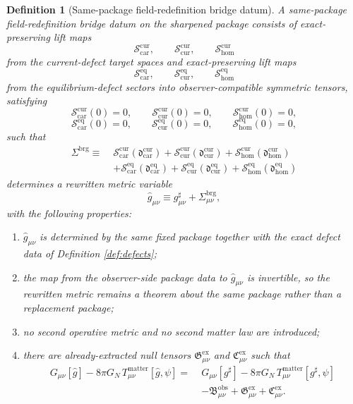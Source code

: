\documentclass[11pt]{article}
\newcommand{\CompletedMetric}{g^{\sharp}}
\newcommand{\RedefMetric}{\widehat g}
\newcommand{\BridgeShift}{\Sigma^{\mathrm{brg}}}
\newcommand{\ObsBurden}{\mathfrak B_{\mu\nu}^{\mathrm{obs}}}
\newcommand{\GaugeExact}{\mathfrak G_{\mu\nu}^{\mathrm{ex}}}
\newcommand{\ConstraintExact}{\mathfrak C_{\mu\nu}^{\mathrm{ex}}}
\newcommand{\TensorShiftLift}{\mathcal S_{\mathrm{car}}^{\mathrm{cur}}}
\newcommand{\CurShiftLift}{\mathcal S_{\mathrm{cur}}^{\mathrm{cur}}}
\newcommand{\HomShiftLift}{\mathcal S_{\mathrm{hom}}^{\mathrm{cur}}}
\newcommand{\TensorEqLift}{\mathcal S_{\mathrm{car}}^{\mathrm{eq}}}
\newcommand{\CurEqLift}{\mathcal S_{\mathrm{cur}}^{\mathrm{eq}}}
\newcommand{\HomEqLift}{\mathcal S_{\mathrm{hom}}^{\mathrm{eq}}}
\newtheorem{definition}{Definition}
\begin{document}
\begin{definition}[Same-package field-redefinition bridge datum]
\label{def:redef_bridge}
A \emph{same-package field-redefinition bridge datum} on the sharpened package consists of exact-preserving lift maps
\[
\TensorShiftLift,\qquad
\CurShiftLift,\qquad
\HomShiftLift
\]
from the current-defect target spaces and exact-preserving lift maps
\[
\TensorEqLift,\qquad
\CurEqLift,\qquad
\HomEqLift
\]
from the equilibrium-defect sectors into observer-compatible symmetric tensors, satisfying
\[
\TensorShiftLift(0)=0,\qquad
\CurShiftLift(0)=0,\qquad
\HomShiftLift(0)=0,
\]
\[
\TensorEqLift(0)=0,\qquad
\CurEqLift(0)=0,\qquad
\HomEqLift(0)=0,
\]
such that
\begin{equation}
\begin{aligned}
\BridgeShift
\equiv\;&
\TensorShiftLift\!\left(\mathfrak d_{\mathrm{car}}^{\mathrm{cur}}\right)
+\CurShiftLift\!\left(\mathfrak d_{\mathrm{cur}}^{\mathrm{cur}}\right)
+\HomShiftLift\!\left(\mathfrak d_{\mathrm{hom}}^{\mathrm{cur}}\right)
\\
&+\TensorEqLift\!\left(\mathfrak d_{\mathrm{car}}^{\mathrm{eq}}\right)
+\CurEqLift\!\left(\mathfrak d_{\mathrm{cur}}^{\mathrm{eq}}\right)
+\HomEqLift\!\left(\mathfrak d_{\mathrm{hom}}^{\mathrm{eq}}\right)
\end{aligned}
\label{eq:bridgeshift}
\end{equation}
determines a rewritten metric variable
\begin{equation}
\RedefMetric_{\mu\nu}\equiv\CompletedMetric_{\mu\nu}+\BridgeShift_{\mu\nu},
\label{eq:redefmetric}
\end{equation}
with the following properties:
\begin{enumerate}
    \item \(\RedefMetric_{\mu\nu}\) is determined by the same fixed package together with the exact defect data of Definition \ref{def:defects};
    \item the map from the observer-side package data to \(\RedefMetric_{\mu\nu}\) is invertible, so the rewritten metric remains a theorem about the same package rather than a replacement package;
    \item no second operative metric and no second matter law are introduced;
    \item there are already-extracted null tensors \(\GaugeExact\) and \(\ConstraintExact\) such that
    \begin{equation}
    \begin{aligned}
    G_{\mu\nu}[\RedefMetric]
    -8\pi G_N\,T_{\mu\nu}^{\mathrm{matter}}[\RedefMetric,\psi]
    =\;&
    G_{\mu\nu}[\CompletedMetric]
    -8\pi G_N\,T_{\mu\nu}^{\mathrm{matter}}[\CompletedMetric,\psi]
    \\
    &-\ObsBurden+\GaugeExact+\ConstraintExact.
    \end{aligned}
    \label{eq:redef_bridge}
    \end{equation}
\end{enumerate}
\end{definition}
\end{document}

